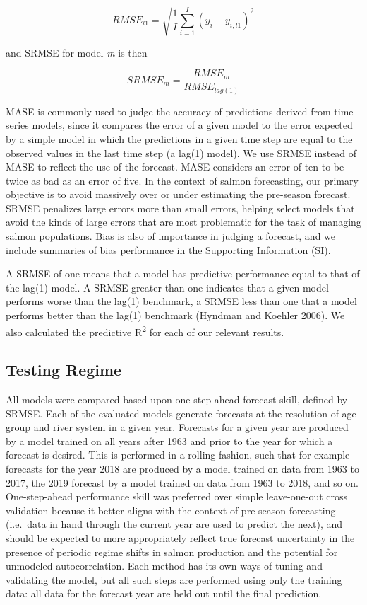 \documentclass[
]{article}
\begin{document}
\[RMSE_{l1} = \sqrt{\frac{1}{I}\sum\limits_{i = 1}^I(y_{i} - y_{i,l1})^2}\]

and SRMSE for model \emph{m} is then

\[SRMSE_m = \frac{RMSE_m}{RMSE_{lag(1)}}\]

MASE is commonly used to judge the accuracy of predictions derived from time series models, since it compares the error of a given model to the error expected by a simple model in which the predictions in a given time step are equal to the observed values in the last time step (a lag(1) model). We use SRMSE instead of MASE to reflect the use of the forecast. MASE considers an error of ten to be twice as bad as an error of five. In the context of salmon forecasting, our primary objective is to avoid massively over or under estimating the pre-season forecast. SRMSE penalizes large errors more than small errors, helping select models that avoid the kinds of large errors that are most problematic for the task of managing salmon populations. Bias is also of importance in judging a forecast, and we include summaries of bias performance in the Supporting Information (SI).

A SRMSE of one means that a model has predictive performance equal to that of the lag(1) model. A SRMSE greater than one indicates that a given model performs worse than the lag(1) benchmark, a SRMSE less than one that a model performs better than the lag(1) benchmark (Hyndman and Koehler 2006). We also calculated the predictive R\textsuperscript{2} for each of our relevant results.

\hypertarget{testing-regime}{%
\subsection{Testing Regime}\label{testing-regime}}

All models were compared based upon one-step-ahead forecast skill, defined by SRMSE. Each of the evaluated models generate forecasts at the resolution of age group and river system in a given year. Forecasts for a given year are produced by a model trained on all years after 1963 and prior to the year for which a forecast is desired. This is performed in a rolling fashion, such that for example forecasts for the year 2018 are produced by a model trained on data from 1963 to 2017, the 2019 forecast by a model trained on data from 1963 to 2018, and so on. One-step-ahead performance skill was preferred over simple leave-one-out cross validation because it better aligns with the context of pre-season forecasting (i.e.~data in hand through the current year are used to predict the next), and should be expected to more appropriately reflect true forecast uncertainty in the presence of periodic regime shifts in salmon production and the potential for unmodeled autocorrelation. Each method has its own ways of tuning and validating the model, but all such steps are performed using only the training data: all data for the forecast year are held out until the final prediction.
\end{document}
